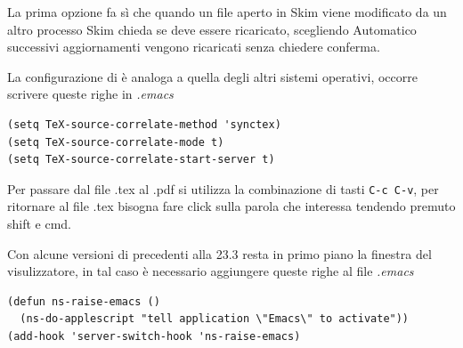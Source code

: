 \documentclass[11pt,a4paper]{article}
\begin{document}
La prima opzione fa sì che quando un file aperto in Skim viene
modificato da un altro processo Skim chieda se deve essere ricaricato,
scegliendo Automatico successivi aggiornamenti vengono ricaricati
senza chiedere conferma.

La configurazione di \emacs{} è analoga a quella degli altri sistemi
operativi, occorre scrivere queste righe in \emph{.emacs}
\begin{Verbatim}
(setq TeX-source-correlate-method 'synctex)
(setq TeX-source-correlate-mode t)
(setq TeX-source-correlate-start-server t)
\end{Verbatim}

Per passare dal file .tex al .pdf si utilizza la combinazione di tasti
\verb!C-c C-v!, per ritornare al file .tex bisogna fare click sulla
parola che interessa tendendo premuto shift e cmd.

Con alcune versioni di \emacs{} precedenti alla 23.3 resta in primo
piano la finestra del visulizzatore, in tal caso è necessario
aggiungere queste righe al file \emph{.emacs}
\begin{Verbatim}
(defun ns-raise-emacs ()
  (ns-do-applescript "tell application \"Emacs\" to activate"))
(add-hook 'server-switch-hook 'ns-raise-emacs)
\end{Verbatim}





\end{document}
